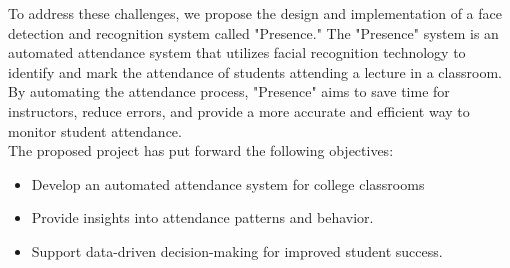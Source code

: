 To address these challenges, we propose the design and implementation of a face detection and recognition system called "Presence." The "Presence" system is an automated attendance system that utilizes facial recognition technology to identify and mark the attendance of students attending a lecture in a classroom. By automating the attendance process, "Presence" aims to save time for instructors, reduce errors, and provide a more accurate and efficient way to monitor student attendance.\\

The proposed project has put forward the following objectives:

\begin{itemize}
	\item Develop an automated attendance system for college classrooms
	\item Provide insights into attendance patterns and behavior.
        \item Support data-driven decision-making for improved student success.
  
\end{itemize}